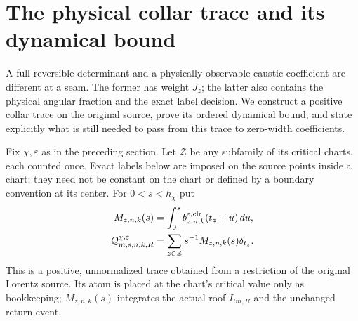 \section{The physical collar trace and its dynamical bound}
\label{sec:v66-collar-trace}
A full reversible determinant and a physically observable caustic
coefficient are different at a seam. The former has weight $J_z$;
the latter also contains the physical angular fraction and the exact
label decision. We construct a positive collar trace on the original
source, prove its ordered dynamical bound, and state explicitly what
is still needed to pass from this trace to zero-width coefficients.

Fix $\chi,\varepsilon$ as in the preceding section. Let $\mathcal Z$
be any subfamily of its critical charts, each counted once. Exact
labels below are imposed on the source points inside a chart; they
need not be constant on the chart or defined by a boundary convention
at its center. For $0<s<h_\chi$ put
\begin{align}\label{eq:v66-collar-trace-definition}
 M_{z,n,k}(s)&=\int_0^s
               b_{z,n,k}^{\varepsilon,\mathrm{clr}}(t_z+u)\,du,
 \notag\\
 \mathcal Q^{\chi,\varepsilon}_{m,s;n,k,R}
                &=\sum_{z\in\mathcal Z}s^{-1}M_{z,n,k}(s)\delta_{t_z}.
\end{align}
This is a positive, unnormalized trace obtained from a restriction of
the original Lorentz source. Its atom is placed at the chart's critical
value only as bookkeeping; $M_{z,n,k}(s)$ integrates the actual roof
$L_{m,R}$ and the unchanged return event.

